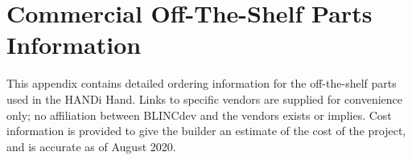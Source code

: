 
\chapter{Commercial Off-The-Shelf Parts Information} %

\label{AppendixA}

This appendix contains detailed ordering information for the off-the-shelf parts used in the HANDi Hand. Links to specific vendors are supplied for convenience only; no affiliation between BLINCdev and the vendors exists or implies. Cost information is provided to give the builder an estimate of the cost of the project, and is accurate as of August 2020.